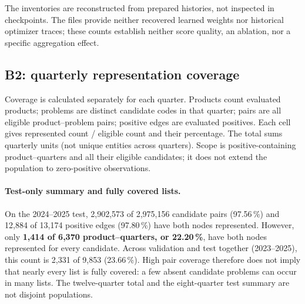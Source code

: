\begin{table}[!htbp]\centering\scriptsize\setlength{\tabcolsep}{2pt}
\caption{B1, graph inventories and triplet-gradient steps implied by the loops; counts reconstructed from . “--” is not applicable to spectral factorization.}
\label{tab:maude-B1-graph}

\end{table}

\FloatBarrier
The inventories are reconstructed from prepared histories, not inspected in checkpoints. The files provide neither recovered learned weights nor historical optimizer traces; these counts establish neither score quality, an ablation, nor a specific aggregation effect.

\par{}
\subsection{B2: quarterly representation coverage}
Coverage is calculated separately for each quarter. Products count evaluated products; problems are distinct candidate codes in that quarter; pairs are all eligible product--problem pairs; positive edges are evaluated positives. Each cell gives represented count / eligible count and their percentage. The total sums quarterly units (not unique entities across quarters). Scope is positive-containing product--quarters and all their eligible candidates; it does not extend the population to zero-positive observations.

\begin{table}[!htbp]\centering\scriptsize\setlength{\tabcolsep}{2pt}
\caption{B2, quarterly coverage: represented / eligible (coverage percentage). The total covers 2023--2025; the last row covers only the 2024--2025 test. Counts come from .}
\label{tab:maude-B2-coverage}

\end{table}

\FloatBarrier
\par{}
\paragraph{Test-only summary and fully covered lists.}
On the 2024--2025 test, 2,902,573 of 2,975,156 candidate pairs (97.56\,\%) and 12,884 of 13,174 positive edges (97.80\,\%) have both nodes represented. However, only \textbf{1,414 of 6,370 product--quarters, or 22.20\,\%}, have both nodes represented for every candidate. Across validation and test together (2023--2025), this count is 2,331 of 9,853 (23.66\,\%). High pair coverage therefore does not imply that nearly every list is fully covered: a few absent candidate problems can occur in many lists. The twelve-quarter total and the eight-quarter test summary are not disjoint populations.

